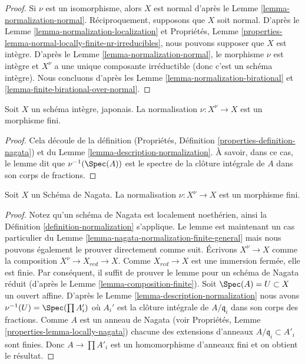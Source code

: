 \begin{proof}
Si $\nu$ est un isomorphisme, alors $X$
est normal d'après le Lemme
\ref{lemma-normalization-normal}. Réciproquement,
supposons que $X$ soit normal. D'après
le Lemme \ref{lemma-normalization-localization} et Propriétés, Lemme \ref{properties-lemma-normal-locally-finite-nr-irreducibles}, nous pouvons
supposer que $X$
est intègre. D'après le Lemme \ref{lemma-normalization-normal}, le morphisme
$\nu$ est intègre et $X^\nu$ a une unique
composante irréductible
(donc c'est un schéma intègre). Nous concluons d'après
les Lemme \ref{lemma-normalization-birational} et \ref{lemma-finite-birational-over-normal}.
\end{proof}

\begin{lemma}
\label{lemma-Japanese-normalization}
Soit $X$ un schéma intègre, japonais.
La normalisation $\nu : X^\nu \to X$ est un morphisme fini.
\end{lemma}

\begin{proof}
Cela découle de la définition
(Propriétés, Définition \ref{properties-definition-nagata}) et du Lemme
\ref{lemma-description-normalization}. À savoir, dans ce cas, le lemme dit que
$\nu^{-1}(\Spec(A))$ est le spectre de la clôture intégrale
de $A$ dans son corps de fractions.
\end{proof}

\begin{lemma}
\label{lemma-nagata-normalization}
Soit $X$ un Schéma de
Nagata. La normalisation $\nu : X^\nu \to X$ est un morphisme fini.
\end{lemma}

\begin{proof}
Notez qu'un schéma de Nagata est localement noethérien,
ainsi la Définition \ref{definition-normalization}
s'applique. Le lemme est maintenant un
cas particulier du Lemme \ref{lemma-nagata-normalization-finite-general} mais nous pouvons
également le prouver directement
comme suit. Écrivons $X^\nu \to X$ comme
la composition $X^\nu \to X_{red} \to X$. Comme $X_{red} \to X$ est une immersion
fermée, elle est finie. Par conséquent, il suffit de
prouver le lemme pour un schéma de Nagata réduit
(d'après le Lemme \ref{lemma-composition-finite}). Soit $\Spec(A) = U \subset X$
un ouvert affine. D'après le Lemme \ref{lemma-description-normalization}
nous avons $\nu^{-1}(U) = \Spec(\prod A_i')$ où $A_i'$ est la clôture
intégrale de $A/\mathfrak q_i$ dans son corps des fractions. Comme $A$
est un anneau de Nagata (voir Propriétés, Lemme \ref{properties-lemma-locally-nagata}) chacune
des extensions d'anneaux
$A/\mathfrak q_i \subset A'_i$ sont finies. Donc $A \to \prod A'_i$ est un homomorphisme d'anneaux
fini et on obtient le résultat.
\end{proof}

